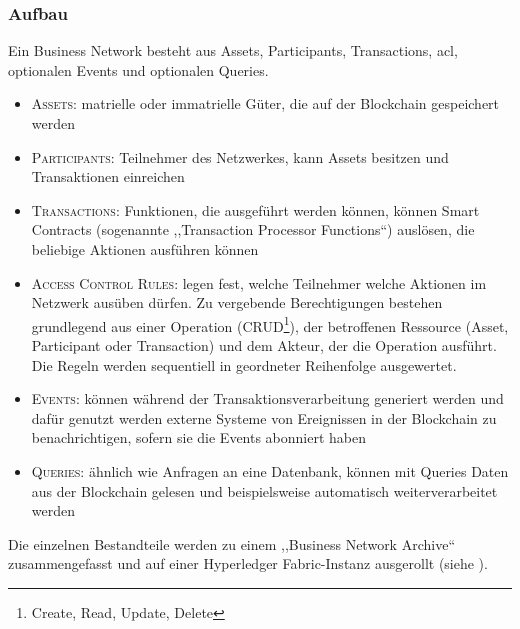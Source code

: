         \subsubsection*{Aufbau}
            Ein Business Network besteht aus Assets, Participants, Transactions, \gls{acl}, optionalen Events und optionalen Queries.
            \begin{itemize}
                \item \textsc{Assets}: matrielle oder immatrielle Güter, die auf der Blockchain gespeichert werden
                \item \textsc{Participants}: Teilnehmer des Netzwerkes, kann Assets besitzen und Transaktionen einreichen
                \item \textsc{Transactions}: Funktionen, die ausgeführt werden können, können Smart Contracts (sogenannte ,,Transaction Processor Functions``) auslösen, die  beliebige Aktionen ausführen können
                \item \textsc{Access Control Rules}: legen fest, welche Teilnehmer welche Aktionen im Netzwerk ausüben dürfen. 
                    Zu vergebende Berechtigungen bestehen grundlegend aus einer Operation (CRUD\!\footnote{Create, Read, Update, Delete}), der betroffenen Ressource (Asset, Participant oder Transaction) und dem Akteur, der die Operation ausführt.
                    Die Regeln werden sequentiell in geordneter Reihenfolge ausgewertet. 
                \item \textsc{Events}: können während der Transaktionsverarbeitung generiert werden und dafür genutzt werden externe Systeme von Ereignissen in der Blockchain zu benachrichtigen, sofern sie die Events abonniert haben
                \item \textsc{Queries}: ähnlich wie Anfragen an eine Datenbank, können mit Queries Daten aus der Blockchain gelesen und beispielsweise automatisch weiterverarbeitet werden
            \end{itemize}
            Die einzelnen Bestandteile werden zu einem ,,Business Network Archive`` zusammengefasst und auf einer Hyperledger Fabric-Instanz ausgerollt (siehe ).
            
